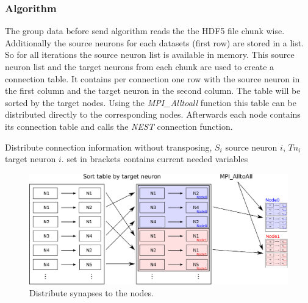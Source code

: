 \documentclass[a4paper]{article}
\begin{document}
\subsubsection{Algorithm}
The group data before send algorithm reads the the HDF5 file chunk wise.
Additionally the source neurons for each datasets (first row) are stored in a list.
So for all iterations the source neuron list is available in memory.
This source neuron list and the target neurons from each chunk are used to create a connection table.
It contains per connection one row with the source neuron in the first column and the target neuron in the second column.
The table will be sorted by the target nodes.
Using the \emph{MPI\_Alltoall} function this table can be distributed directly to the corresponding nodes.
Afterwards each node contains its connection table and calls the \emph{NEST} connection function.
\begin{algorithm}
\label{alg2}
\caption{Distribute connection information without transposing, $S_i$ source neuron $i$, $Tn_i$ target neuron $i$.
	set in brackets contains current needed variables}
\end{algorithm}

\begin{figure}[ht!]
\centering
\includegraphics[scale=0.7]{sort_table_all_alltoall.eps}
\caption{Distribute synapses to the nodes.}
\end{figure}
\end{document}
